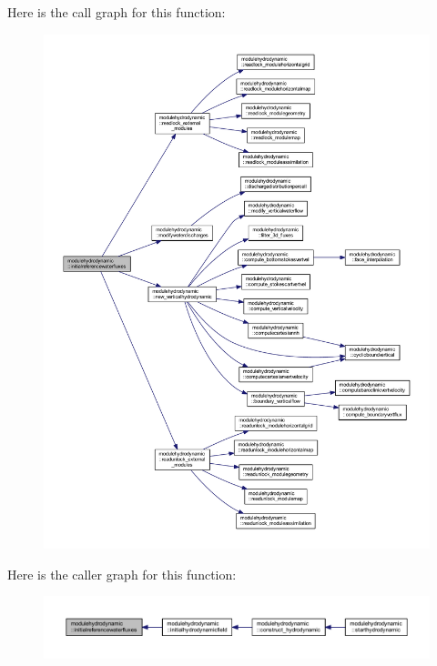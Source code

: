Here is the call graph for this function\+:\nopagebreak
\begin{figure}[H]
\begin{center}
\leavevmode
\includegraphics[width=350pt]{namespacemodulehydrodynamic_a6cc306a7b1d6e64156d2df83e7ea6550_cgraph}
\end{center}
\end{figure}
Here is the caller graph for this function\+:\nopagebreak
\begin{figure}[H]
\begin{center}
\leavevmode
\includegraphics[width=350pt]{namespacemodulehydrodynamic_a6cc306a7b1d6e64156d2df83e7ea6550_icgraph}
\end{center}
\end{figure}
\mbox{\label{namespacemodulehydrodynamic_a2237f44be04f4c5aeac0890ddec1ce4b}} 
